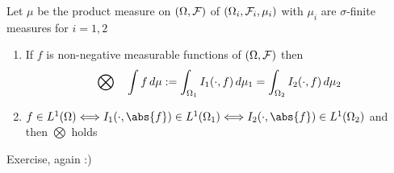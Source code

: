 \begin{thm}
\label{Fubini}
Let $\mu$ be the product measure on $(\Omega, \mathcal{F})$ of $(\Omega_i, \mathcal{F}_i, \mu_i)$ with $\mu_i$ are $\sigma$-finite measures for $i=1,2$
\begin{enumerate}
    \item If $f$ is non-negative measurable functions of $(\Omega, \mathcal{F})$ then 
    \begin{equation*}
        \bigotimes \quad \int f \mathop{}\!d\mu := \int_{\Omega_1} I_1(\cdot, f) \mathop{}\!d \mu_1 = \int_{\Omega_2} I_2(\cdot, f) \mathop{}\!d \mu_2 
    \end{equation*}
    \item $f\in \ls{1}(\Omega)\Longleftrightarrow I_1(\cdot, \abs{f})\in \ls{1}(\Omega_1) \Longleftrightarrow I_2(\cdot, \abs{f})\in \ls{1}(\Omega_2)$ and then $\bigotimes$ holds
\end{enumerate}
\end{thm}
\pf  Exercise, again :)